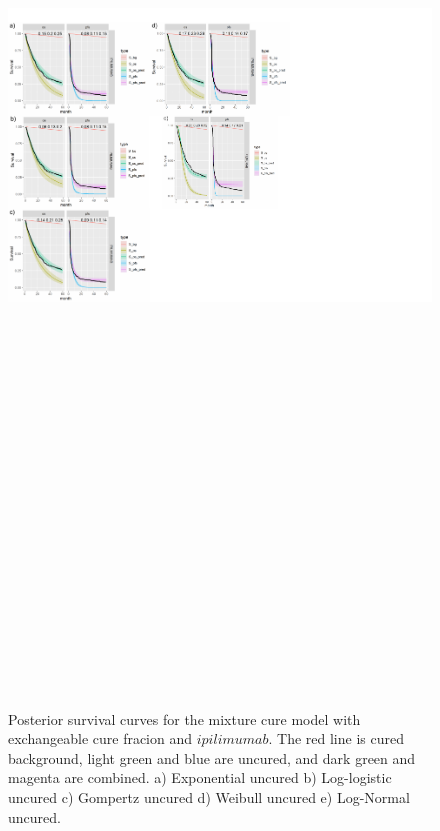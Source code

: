 \documentclass[
]{article}
\begin{document}
\begin{figure}

{\centering \includegraphics[width=25cm,height=40cm]{Check_mate_analysis_files/figure-latex/unnamed-chunk-7-1} 

}

\caption{\label{fig:IPI}Posterior survival curves for the mixture cure model with exchangeable cure fracion and $ipilimumab$. The red line is cured background, light green and blue are uncured, and dark green and magenta are combined. a) Exponential uncured b) Log-logistic uncured c) Gompertz uncured d) Weibull uncured e) Log-Normal uncured.}\label{fig:unnamed-chunk-7}
\end{figure}
\end{document}
